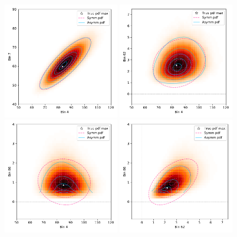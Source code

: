 \documentclass[11pt]{article}
\begin{document}
\begin{figure}%
  \centering
  \includegraphics[width=0.45\textwidth]{figures/corr-4-7}
  \includegraphics[width=0.45\textwidth]{figures/corr-4-62}\\
  \includegraphics[width=0.45\textwidth]{figures/corr-4-86}
  \includegraphics[width=0.45\textwidth]{figures/corr-62-86}

\end{figure}
\end{document}
